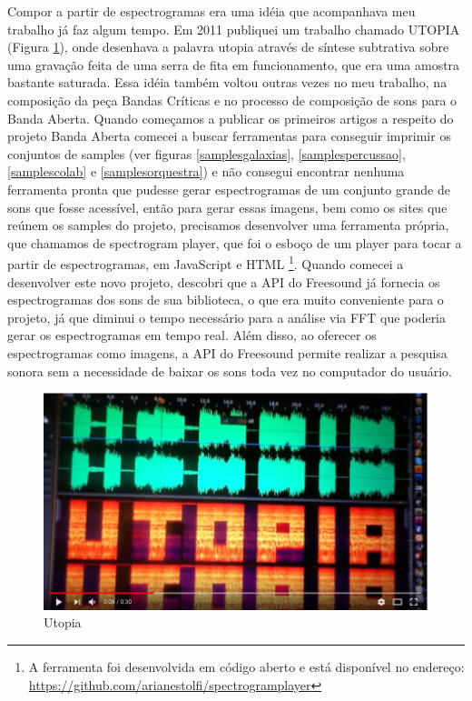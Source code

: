 Compor a partir de espectrogramas era uma idéia que acompanhava meu trabalho já faz algum tempo. Em 2011 publiquei um trabalho chamado UTOPIA (Figura \ref{utopia}), onde desenhava a palavra utopia através de síntese subtrativa sobre uma gravação feita de uma serra de fita em funcionamento, que era uma amostra bastante saturada. Essa idéia também voltou outras vezes no meu trabalho, na composição da peça Bandas Críticas e no processo de composição de sons para o Banda Aberta. Quando começamos a publicar os primeiros artigos a respeito do projeto Banda Aberta comecei a buscar ferramentas para conseguir imprimir os conjuntos de samples (ver figuras \ref{samplesgalaxias}, \ref{samplespercussao}, \ref{samplescolab} e \ref{samplesorquestra}) e não consegui encontrar nenhuma ferramenta pronta que pudesse gerar espectrogramas de um conjunto grande de sons que fosse acessível, então para gerar essas imagens, bem como os sites que reúnem os samples do projeto, precisamos desenvolver uma ferramenta própria, que chamamos de spectrogram player, que foi o esboço de um player para tocar a partir de espectrogramas, em JavaScript e HTML \footnote{A ferramenta foi desenvolvida em código aberto e está disponível no endereço: \url{https://github.com/arianestolfi/spectrogramplayer}}. Quando comecei a desenvolver este novo projeto, descobri que a API do Freesound já fornecia os espectrogramas dos sons de sua biblioteca, o que era muito conveniente para o projeto, já que diminui o tempo necessário para a análise via FFT que poderia gerar os espectrogramas em tempo real. Além disso, ao oferecer os espectrogramas como imagens, a API do Freesound permite realizar a pesquisa sonora sem a necessidade de baixar os sons toda vez no computador do usuário.

\begin{figure}
\includegraphics[width=1\textwidth]{pictures/cap4/utopia}
\caption{\label{utopia}Utopia }
\label{utopia}
\end{figure}

